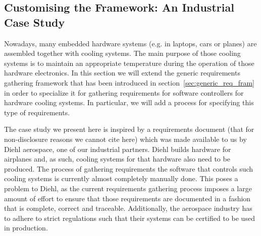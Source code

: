 
\subsection{Customising the Framework: An Industrial Case
Study}
\label{sec:custom_frame}
\vspace{-.3cm}
Nowadays, many embedded hardware systems (e.g. in laptops, cars or planes) are
assembled together with cooling systems. The main purpose of those cooling
systems is to maintain an appropriate temperature during the operation of those
hardware electronics. In this section we will extend the generic requirements
gathering framework that has been introduced in
section~\ref{sec:generic_req_fram} in order to specialize it for gathering
requirements for software controllers for hardware cooling systems. In
particular, we will add a process for specifying this type of requirements.

The case study we present here is inspired by a requirements document (that for
non-disclosure reasons we cannot cite here) which was made available to us by
Diehl aerospace, one of our industrial partners. Diehl builds hardware for
airplanes and, as such, cooling systems for that hardware also need to be
produced. The process of gathering requirements the software that controls such
cooling systems is currently almost completely manually done. This poses a
problem to Diehl, as the current requirements gathering process imposes a large
amount of effort to ensure that those requirements are documented in a fashion
that is complete, correct and traceable. Additionally, the aerospace industry
has to adhere to strict regulations such that their systems can be certified to
be used in production. 

